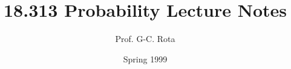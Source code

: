 \setlength{\parskip}{\baselineskip} 
\setlength{\parindent}{0em} 

\newcommand\tder[2]{\frac{d#1}{d#2}}
\newcommand{\paren}[1]{\left(#1\right)}

\renewcommand{\Pr}[1]{\mbox{Pr}\left[#1\right]}
\newcommand{\E}[1]{\mbox{E}\left[#1\right]}
\newcommand{\diff}[2]{\frac{d#1}{d#2}}
\def\given{\mathrel|}
\newcommand{\dens}{\mbox{dens}}
\newcommand{\cdf}{\mbox{cdf}}

\newcommand{\QED}{$\;\;\;\rule[0.1mm]{2mm}{2mm}$}
\newcommand{\reals}{\mbox{\msym R}}

\newtheorem{definition}{Definition}

\newcommand{\nolineskips}{%
\setlength{\parskip}{0pt}%
\setlength{\parsep}{0pt}%
\setlength{\topsep}{0pt}%
\setlength{\partopsep}{0pt}%
\setlength{\itemsep}{0pt}}

\title{\LARGE 18.313 Probability Lecture Notes}
\author{\LARGE Prof. G-C. Rota}
\date{\LARGE Spring 1999}

\maketitle 

\chapter{} 
\chapter{} 
\chapter{} 
\chapter{} 
\chapter{} 
\chapter{} 
\chapter{} 
